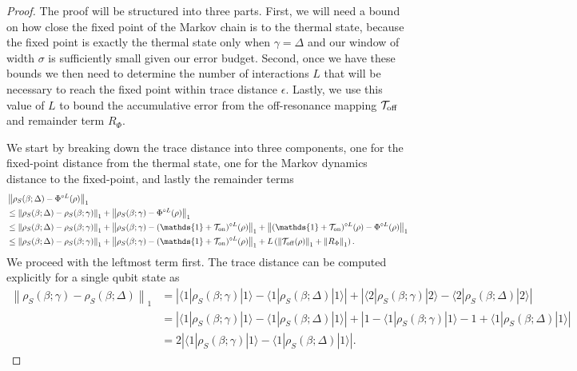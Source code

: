 \documentclass[
 amsmath,amssymb,
 aps,
onecolumn, 
nofootinbib]{revtex4-2}
\newcommand{\on}{\rm on}
\newcommand{\off}{\rm off}
\newcommand{\ket}[1]{|#1\rangle}
\newcommand{\bra}[1]{\langle #1|}
\newcommand{\abs}[1]{\left| #1 \right|}
\newcommand{\norm}[1]{\left\| #1 \right\|}
\newcommand{\identity}{\mathds{1}}
\begin{document}
\begin{proof}
    The proof will be structured into three parts. First, we will need a bound on how close the fixed point of the Markov chain is to the thermal state, because  the fixed point  is exactly the thermal state only when $\gamma = \Delta$ and our window of width $\sigma$ is sufficiently small given our error budget. Second, once we have these bounds we then need to determine the number of interactions $L$ that will be necessary to reach the fixed point within trace distance $\epsilon$. Lastly, we use this value of $L$ to bound the accumulative error from the off-resonance mapping $\mathcal{T}_{\off}$ and remainder term $R_{\Phi}$.

    We start by breaking down the trace distance into three components, one for the fixed-point distance from the thermal state, one for the Markov dynamics distance to the fixed-point, and lastly the remainder terms
    \begin{align}
        &\norm{\rho_S(\beta; \Delta) - \Phi^{\circ L}(\rho)}_1 \nonumber \\
        &\le \norm{\rho_S(\beta; \Delta) - \rho_S(\beta; \gamma)}_1 + \norm{\rho_S(\beta; \gamma) - \Phi^{\circ L}(\rho)}_1 \\
        &\le \norm{\rho_S(\beta; \Delta) - \rho_S(\beta; \gamma)}_1 + \norm{\rho_S(\beta; \gamma) - (\identity + \mathcal{T}_{\on})^{\circ L}(\rho)}_1 + \norm{(\identity + \mathcal{T}_{\on})^{\circ L}(\rho) - \Phi^{\circ L}(\rho)}_1 \\
        &\le \norm{\rho_S(\beta; \Delta) - \rho_S(\beta; \gamma)}_1 + \norm{\rho_S(\beta; \gamma) - (\identity + \mathcal{T}_{\on})^{\circ L}(\rho)}_1 +  L \left(\norm{\mathcal{T}_{\off}(\rho)}_1 + \norm{R_{\Phi}}_1 \right). \label{eq:single_qubit_three_errors}
    \end{align}
    We proceed with the leftmost term first. The trace distance can be computed explicitly for a single qubit state as 
 \begin{align}
     \norm{\rho_S(\beta; \gamma) - \rho_S(\beta; \Delta)}_1 &= \abs{\bra{1} \rho_S(\beta; \gamma) \ket{1} - \bra{1}\rho_S(\beta;\Delta)\ket{1}} + \abs{\bra{2} \rho_S(\beta; \gamma) \ket{2} - \bra{2}\rho_S(\beta; \Delta)\ket{2}} \\
     &= \abs{\bra{1} \rho_S(\beta; \gamma) \ket{1} - \bra{1}\rho_S(\beta; \Delta)\ket{1}} + \abs{1 - \bra{1} \rho_S(\beta; \gamma) \ket{1} -1 + \bra{1}\rho_S(\beta; \Delta)\ket{1}} \\
     &= 2 \abs{\bra{1} \rho_S(\beta; \gamma) \ket{1} - \bra{1}\rho_S(\beta; \Delta)\ket{1}}. \label{eq:single_qubit_int_1}

\end{align}
\end{proof}
\end{document}
